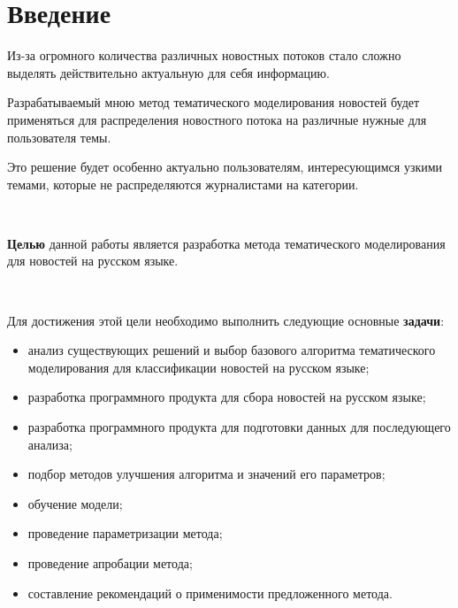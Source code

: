 \chapter{Введение}

Из-за огромного количества различных новостных потоков стало сложно выделять действительно актуальную для себя информацию. 

Разрабатываемый мною метод тематического моделирования новостей будет применяться для распределения новостного потока на различные нужные для пользователя темы.

Это решение будет особенно актуально пользователям, интересующимся узкими темами, которые не распределяются журналистами на категории.

~\

\textbf{Целью} данной работы является разработка метода тематического моделирования для новостей на русском языке.

~\

Для достижения этой цели необходимо выполнить следующие основные \textbf{задачи}:

\begin{itemize}
    \item анализ существующих решений и выбор базового алгоритма тематического моделирования для классификации новостей на русском языке;
    \item разработка программного продукта для сбора новостей на русском языке;
    \item разработка программного продукта для подготовки данных для последующего анализа;
    \item подбор методов улучшения алгоритма и значений его параметров;
    \item обучение модели;
    \item проведение параметризации метода;
    \item проведение апробации метода;
    \item составление рекомендаций о применимости предложенного метода.
\end{itemize}


